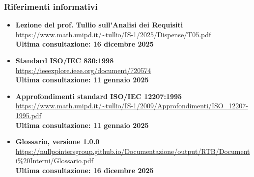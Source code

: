 	\subsubsection{Riferimenti informativi}
	\begin{itemize}[itemsep=5pt, parsep=5pt, label=$\scriptstyle\bullet$]
	
	\item \textbf{Lezione del prof. Tullio sull'Analisi dei Requisiti} \\
	\url{https://www.math.unipd.it/~tullio/IS-1/2025/Dispense/T05.pdf}\\[3pt]
	\textbf{Ultima consultazione: 16 dicembre 2025}
	
	\item \textbf{Standard ISO/IEC 830:1998} \\
	\url{https://ieeexplore.ieee.org/document/720574} \\[3pt]
	\textbf{Ultima consultazione: 11 gennaio 2025}
	
	\item \textbf{Approfondimenti standard ISO/IEC 12207:1995} \\
	\url{https://www.math.unipd.it/~tullio/IS-1/2009/Approfondimenti/ISO_12207-1995.pdf} \\[3pt]
	\textbf{Ultima consultazione: 11 gennaio 2025}
    
    \item \textbf{Glossario, versione 1.0.0} \\
    \url{https://nullpointersgroup.github.io/Documentazione/output/RTB/Documenti%20Interni/Glossario.pdf}\\[3pt]
    \textbf{Ultima consultazione: 16 dicembre 2025}
    
	\end{itemize}
